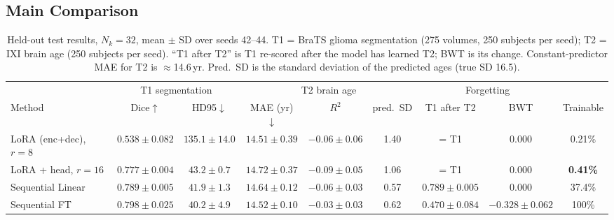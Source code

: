 \documentclass[journal,twoside,web]{ieeecolor}
\begin{document}
\subsection{Main Comparison}
\label{sec:main}

\begin{table}[t]
\caption{Held-out test results, $N_k=32$, mean $\pm$ SD over seeds 42--44. T1 = BraTS glioma segmentation (275 volumes, 250 subjects per seed); T2 = IXI brain age (250 subjects per seed). ``T1 after T2'' is T1 re-scored after the model has learned T2; BWT is its change. Constant-predictor MAE for T2 is $\approx$14.6\,yr. Pred.\ SD is the standard deviation of the predicted ages (true SD 16.5).}
\label{tab:main}
\centering
\footnotesize
\setlength{\tabcolsep}{3.5pt}
\begin{tabular}{lcccccccc}
\toprule
 & \multicolumn{2}{c}{T1 segmentation} & \multicolumn{3}{c}{T2 brain age} & \multicolumn{2}{c}{Forgetting} & \\
\cmidrule(lr){2-3} \cmidrule(lr){4-6} \cmidrule(lr){7-8}
Method & Dice$\uparrow$ & HD95$\downarrow$ & MAE (yr)$\downarrow$ & $R^2$ & pred.\ SD & T1 after T2 & BWT & Trainable \\
\midrule
LoRA (enc+dec), $r{=}8$   & $0.538\pm0.082$ & $135.1\pm14.0$ & $14.51\pm0.39$ & $-0.06\pm0.06$ & 1.40 & = T1 & 0.000 & 0.21\% \\
LoRA + head, $r{=}16$     & $0.777\pm0.004$ & $43.2\pm0.7$   & $14.72\pm0.37$ & $-0.09\pm0.05$ & 1.06 & = T1 & 0.000 & \textbf{0.41\%} \\
Sequential Linear  & $0.789\pm0.005$ & $41.9\pm1.3$   & $14.64\pm0.12$ & $-0.06\pm0.03$ & 0.57 & $0.789\pm0.005$ & 0.000 & 37.4\% \\
Sequential FT      & $\mathbf{0.798\pm0.025}$ & $\mathbf{40.2\pm4.9}$ & $14.52\pm0.10$ & $-0.03\pm0.03$ & 0.62 & $0.470\pm0.084$ & $-0.328\pm0.062$ & 100\% \\
\bottomrule
\end{tabular}
\end{table}
\end{document}
